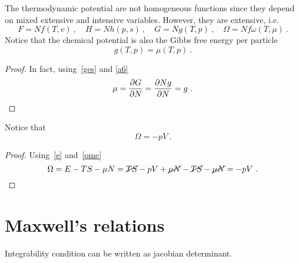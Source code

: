     The thermodynamic potential are not homogeneous functions since they depend on mixed extensive and intensive variables. However, they are extensive, i.e. 
    \begin{equation}\label{a6}
        F = N f(T, v) ~, \quad H = N h(p, s) ~, \quad G = N g(T, p) ~, \quad \Omega = N f \omega (T, \mu) ~. 
    \end{equation}
    Notice that the chemical potential is also the Gibbs free energy per particle
    \begin{equation}
        g(T, p) = \mu(T, p) ~.
    \end{equation}
    \begin{proof}
        In fact, using~\eqref{ges} and \eqref{a6}
        \begin{equation*}
            \mu = \frac{\partial G}{\partial N} = \frac{\partial Ng }{\partial N} = g ~.
        \end{equation*}
    \end{proof}

    Notice that 
    \begin{equation*}
        \Omega = - pV ~.
    \end{equation*}
    \begin{proof}
        Using~\eqref{e} and~\eqref{ome}
        \begin{equation*}
            \Omega = E - TS - \mu N = \cancel{TS} - pV + \cancel{\mu N} - \cancel{TS} - \cancel{\mu N} = - pV ~.
        \end{equation*}
    \end{proof}

\section{Maxwell's relations}

    Integrability condition can be written as jacobian determinant. 

